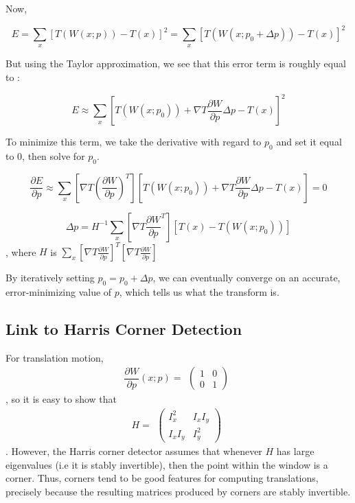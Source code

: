 \documentclass{article}
\begin{document}
Now, 

 $$E = \sum_x {[T(W(x;p)) - T(x)]^2} = \sum_x {[T(W(x;p_0 + \Delta p)) - T(x)]^2}$$
 
 But using the Taylor approximation, we see that this error term is roughly equal to :
 
 $$E \approx \sum_x {[T(W(x;p_0)) + \nabla T \frac{\partial W }{\partial p} \Delta p - T(x)]^2}$$
 
To minimize this term, we take the derivative with regard to $p_0$ and set it equal to $0$, then solve for $p_0$.

 $$\frac{\partial E}{\partial p} \approx \sum_x {[\nabla T(\frac{\partial W }{\partial p})^T][T(W(x;p_0)) + \nabla T \frac{\partial W }{\partial p} \Delta p - T(x)]} = 0$$
 
 $$ \Delta p = H^{-1} \sum_x {[\nabla T\frac{\partial W }{\partial p}^T][T(x) - T(W(x;p_0))]}$$, where $H$ is $\sum_x [\nabla T\frac{\partial W }{\partial p}]^T [\nabla T\frac{\partial W }{\partial p}]$

By iteratively setting $p_0 = p_0 + \Delta p$, we can eventually converge on an accurate, error-minimizing value of $p$, which tells us what the transform is.
 
\subsection{Link to Harris Corner Detection}

For translation motion, $$\frac{\partial W}{\partial p} (x; p) = \begin{matrix}\begin{pmatrix} 1 & 0 \\ 0 & 1 \end{pmatrix}\end{matrix}$$, so it is easy to show that $$ H = \begin{matrix}\begin{pmatrix} I_x^2 & I_xI_y \\ I_xI_y & I_y^2 \end{pmatrix}\end{matrix}$$. However, the Harris corner detector assumes that whenever $H$ has large eigenvalues (i.e it is stably invertible), then the point within the window is a corner. Thus, corners tend to be good features for computing translations, precisely because the resulting matrices produced by corners are stably invertible.






\small


\end{document}
